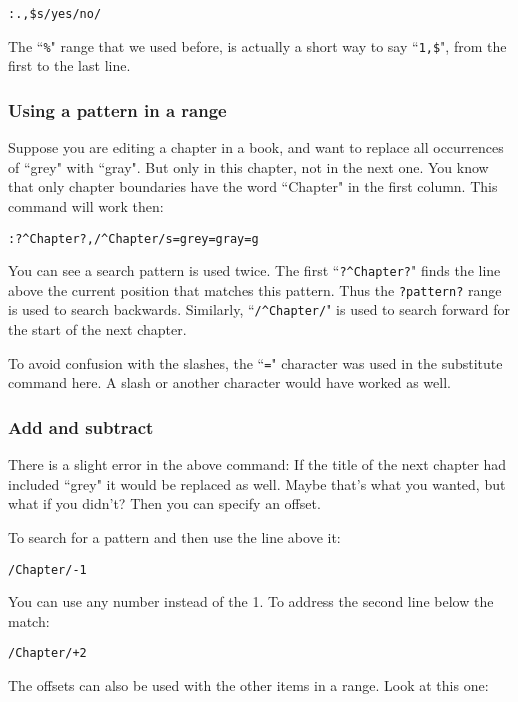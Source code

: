 \begin{Verbatim}[samepage=true]
 :.,$s/yes/no/
\end{Verbatim}

The ``\texttt{\%}" range that we used before, is actually a short way to say ``\texttt{1,\$}", from the first to the last line.
\subsubsection{Using a pattern in a range}
Suppose you are editing a chapter in a book, and want to replace all occurrences of ``grey" with ``gray".
But only in this chapter, not in the next one.
You know that only chapter boundaries have the word ``Chapter" in the first column.
This command will work then:

\begin{Verbatim}[samepage=true]
 :?^Chapter?,/^Chapter/s=grey=gray=g
\end{Verbatim}

You can see a search pattern is used twice.
The first ``\texttt{?\^{}Chapter?}" finds the line above the current position that matches this pattern.
Thus the \texttt{?pattern?} range is used to search backwards.
Similarly, ``\texttt{/\^{}Chapter/}" is used to search forward for the start of the next chapter.

To avoid confusion with the slashes, the ``\texttt{=}" character was used in the substitute command here.
A slash or another character would have worked as well.
\subsubsection{Add and subtract}
There is a slight error in the above command: If the title of the next chapter had included ``grey" it would be replaced as well.
Maybe that's what you wanted, but what if you didn't?  Then you can specify an offset.

To search for a pattern and then use the line above it:

\begin{Verbatim}[samepage=true]
 /Chapter/-1
\end{Verbatim}

You can use any number instead of the 1.
To address the second line below the match:

\begin{Verbatim}[samepage=true]
 /Chapter/+2
\end{Verbatim}

The offsets can also be used with the other items in a range.
Look at this one:

